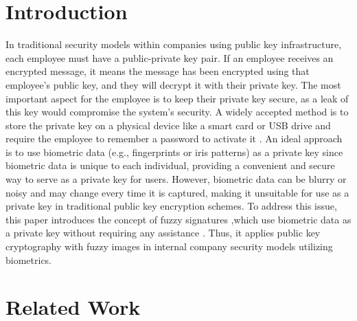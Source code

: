 \documentclass[graybox]{svmult}
\begin{document}
\section{Introduction}
In traditional security models within companies using public key infrastructure, each employee must have a public-private key pair. If an employee receives an encrypted message, it means the message has been encrypted using that employee's public key, and they will decrypt it with their private key. The most important aspect for the employee is to keep their private key secure, as a leak of this key would compromise the system's security. A widely accepted method is to store the private key on a physical device like a smart card or USB drive and require the employee to remember a password to activate it
\parencite{Ellison2000}.
An ideal approach is to use biometric data (e.g., fingerprints or iris patterns)
\parencite{Connaughton2007}
as a private key since biometric data is unique to each individual, providing a convenient and secure way to serve as a private key for users. However, biometric data can be blurry or noisy and may change every time it is captured, making it unsuitable for use as a private key in traditional public key encryption schemes.
To address this issue, this paper introduces the concept of fuzzy signatures
\parencite{Takahashi2015}
,which use biometric data as a private key without requiring any assistance
\parencite{Dodis2008}
. Thus, it applies public key cryptography with fuzzy images
\parencite{Son2016}
in internal company security models utilizing biometrics.

\section{Related Work}
\end{document}
